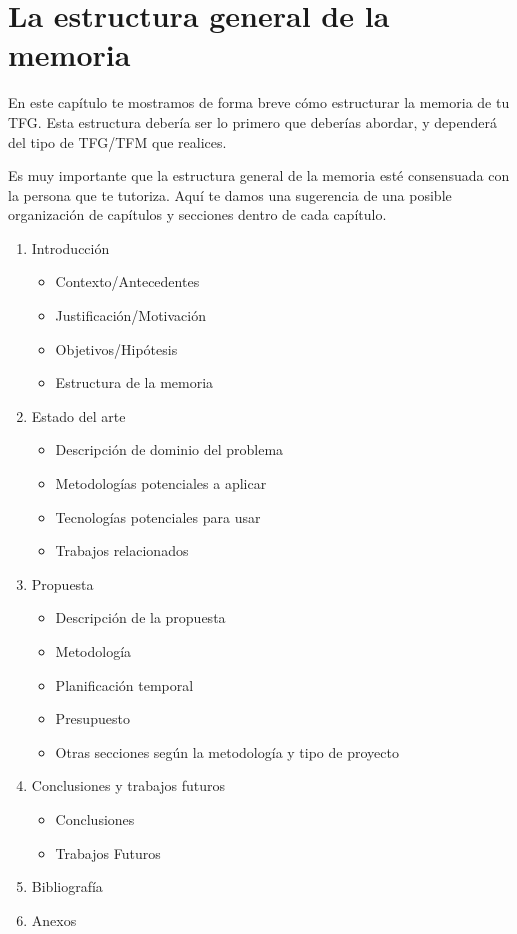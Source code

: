 \chapter{La estructura general de la memoria}
\label{cap:EstructuraMemoria}

En este capítulo te mostramos de forma breve cómo estructurar la memoria de tu TFG. Esta estructura debería ser lo primero que deberías abordar, y dependerá del tipo de TFG/TFM que realices.

Es muy importante que la estructura general de la memoria esté consensuada con la persona que te tutoriza. Aquí te damos una sugerencia de una posible organización de capítulos y secciones dentro de cada capítulo. 


\begin{enumerate}
    \item Introducción
        \begin{itemize}
            \item Contexto/Antecedentes
            \item Justificación/Motivación
            \item Objetivos/Hipótesis
            \item Estructura de la memoria
        \end{itemize}
    \item Estado del arte
        \begin{itemize}
            \item Descripción de dominio del problema
            \item Metodologías potenciales a aplicar
            \item Tecnologías potenciales para usar
            \item Trabajos relacionados
        \end{itemize}
    \item Propuesta
    \begin{itemize}
            \item Descripción de la propuesta
            \item Metodología
            \item Planificación temporal
            \item Presupuesto
            \item Otras secciones según la metodología y tipo de proyecto
        \end{itemize}
    \item Conclusiones y trabajos futuros
    \begin{itemize}
            \item Conclusiones
            \item Trabajos Futuros
        \end{itemize}
    \item Bibliografía
    \item Anexos
\end{enumerate}


